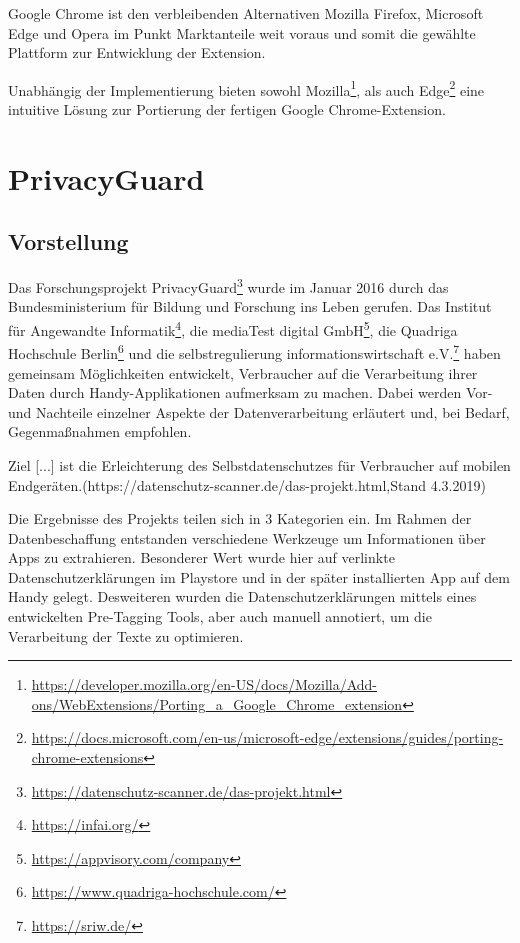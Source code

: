 Google Chrome ist den verbleibenden Alternativen Mozilla Firefox, Microsoft Edge und Opera im Punkt Marktanteile weit voraus und somit die gewählte Plattform zur Entwicklung der Extension.

Unabhängig der Implementierung bieten sowohl Mozilla\footnote{\url{https://developer.mozilla.org/en-US/docs/Mozilla/Add-ons/WebExtensions/Porting_a_Google_Chrome_extension}}, als auch Edge\footnote{\url{https://docs.microsoft.com/en-us/microsoft-edge/extensions/guides/porting-chrome-extensions}} eine intuitive Lösung zur Portierung der fertigen Google Chrome-Extension.

\section{PrivacyGuard}
\label{s:pguard}

\subsection{Vorstellung}
\label{ss:vorstellung}
Das Forschungsprojekt PrivacyGuard\footnote{\url{https://datenschutz-scanner.de/das-projekt.html}} wurde im Januar 2016 durch das Bundesministerium für Bildung und Forschung ins Leben gerufen. Das Institut für Angewandte Informatik\footnote{\url{https://infai.org/}}, die mediaTest digital GmbH\footnote{\url{https://appvisory.com/company}}, die Quadriga Hochschule Berlin\footnote{\url{https://www.quadriga-hochschule.com/}} und die selbstregulierung informationswirtschaft e.V.\footnote{\url{https://sriw.de/}} haben gemeinsam Möglichkeiten entwickelt, Verbraucher auf die Verarbeitung ihrer Daten durch Handy-Applikationen aufmerksam zu machen. Dabei werden Vor- und Nachteile einzelner Aspekte der Datenverarbeitung erläutert und, bei Bedarf, Gegenmaßnahmen empfohlen.

\glqq Ziel [...] ist die Erleichterung des Selbstdatenschutzes für Verbraucher auf mobilen Endgeräten.\grqq{}(https://datenschutz-scanner.de/das-projekt.html,Stand 4.3.2019)

Die Ergebnisse des Projekts teilen sich in 3 Kategorien ein. Im Rahmen der Datenbeschaffung entstanden verschiedene Werkzeuge um Informationen über Apps zu extrahieren. Besonderer Wert wurde hier auf verlinkte Datenschutzerklärungen im Playstore und in der später installierten App auf dem Handy gelegt. Desweiteren wurden die Datenschutzerklärungen mittels eines entwickelten Pre-Tagging Tools, aber auch manuell annotiert, um die Verarbeitung der Texte zu optimieren.

